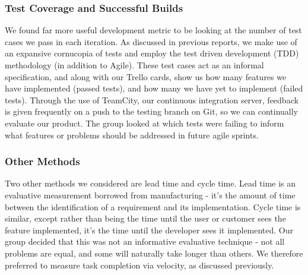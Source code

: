 \documentclass[a4paper, 11pt]{article}
\begin{document}
\subsubsection{ Test Coverage and Successful Builds}
We found far more useful development metric to be looking at the number of test cases we pass in each iteration. As discussed in previous reports, we make use of an expansive cornucopia of tests and employ the test driven development (TDD) methodology (in addition to Agile). These test cases act as an informal specification, and along with our Trello cards, show us how many features we have implemented (passed tests), and how many we have yet to implement (failed tests). Through the use of TeamCity, our continuous integration server, feedback is given frequently on a push to the testing branch on Git, so we can continually evaluate our product. The group looked at which tests were failing to inform what features or problems should be addressed in future agile sprints.
\subsubsection{ Other Methods}
Two other methods we considered are lead time and cycle time. Lead time is an evaluative measurement borrowed from manufacturing - it's the amount of time between the identification of a requirement and its implementation. Cycle time is similar, except rather than being the time until the user or customer sees the feature implemented, it's the time until the developer sees it implemented. Our group decided that this was not an informative evaluative technique - not all problems are equal, and some will naturally take longer than others. We therefore preferred to measure task completion via velocity, as discussed previously.
\end{document}
